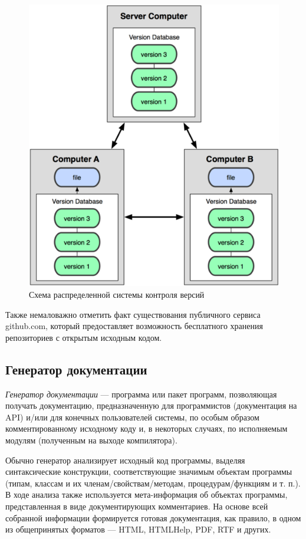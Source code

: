 \begin{figure}[h!]
  \centering
  \includegraphics[width=150mm]{pic/git.png}
  \caption{Схема распределенной системы контроля версий}
  \label{pic:git}
\end{figure}

Также немаловажно отметить факт существования публичного сервиса github.com,
который предоставляет возможность бесплатного хранения репозиториев
с открытым исходным кодом.

\subsection{Генератор документации}

\textit{Генератор документации} --- программа или пакет программ, 
позволяющая получать документацию, предназначенную для программистов
(документация на API) и/или для конечных пользователей системы,
по особым образом комментированному исходному коду и,
в некоторых случаях, по исполняемым модулям (полученным на выходе компилятора).

Обычно генератор анализирует исходный код программы,
выделяя синтаксические конструкции, соответствующие значимым объектам программы 
(типам, классам и их членам/свойствам/методам, процедурам/функциям и т. п.).
В ходе анализа также используется мета-информация об объектах программы,
представленная в виде документирующих комментариев. 
На основе всей собранной информации формируется готовая документация, 
как правило, в одном из общепринятых форматов — HTML, HTMLHelp, PDF, 
RTF и других.

